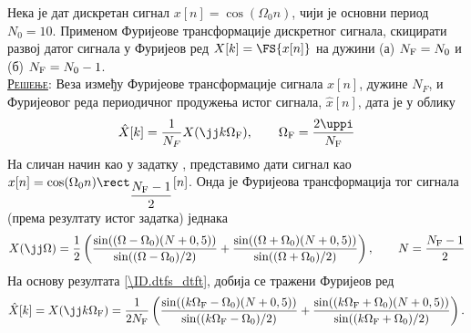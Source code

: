 \PID 
Нека је дат дискретан сигнал $x[n] = \cos(\Omega_0 n)$, чији је основни период $N_0 = 10$. Применом 
Фуријеове трансформације дискретног сигнала, скицирати развој датог сигнала у Фуријеов ред 
$X[k] = \FS{x[n]}$ на дужини (а) $N_{\rm F} = N_0$ и (б) $N_{\rm F} = N_0 - 1$. \\

\textsc{\underline{Решење}:} Веза између Фуријеове трансформације сигнала $x[n]$, дужине $N_F$, и Фуријеовог реда 
периодичног продужења истог сигнала, $\hat x[n]$, дата је у облику 
\begin{equation}
    \hat X[k] = \dfrac{1}{N_F} X(\jj k \Omega_{\rm F}), \qquad \Omega_{\rm F} = \dfrac{2\uppi}{N_{\rm F}} \label{\ID.dtfs_dtft}
\end{equation}
На сличан начин као у задатку , представимо дати сигнал као $x[n] = \cos(\Omega_0 n) \rect_{\dfrac{N_{\rm F}-1}2}[n]$.
Онда је Фуријеова трансформација тог сигнала (према резултату истог задатка) једнака
\begin{equation}
    X(\jj\Omega)
    =
    \dfrac{1}{2} \left(
    \dfrac{\sin( (\Omega - \Omega_0)(N + 0,5) ) }{ \sin((\Omega - \Omega_0)/2) }
    +
    \dfrac{\sin( (\Omega + \Omega_0)(N + 0,5) ) }{ \sin((\Omega + \Omega_0)/2) }  \right), \qquad N = \dfrac{N_{\rm F}-1}{2}
\end{equation}
На основу резултата \ref{\ID.dtfs_dtft}, добија се тражени Фуријеов ред 
\begin{equation}
    \hat X[k] = 
    X(\jj k \Omega_{\rm F} )
    =
    \dfrac{1}{2N_{\rm F}}
    \left(
    \dfrac{\sin( (k \Omega_{\rm F} - \Omega_0)(N + 0,5) ) }{ \sin((k \Omega_{\rm F} - \Omega_0)/2) }
    +
    \dfrac{\sin( (k \Omega_{\rm F} + \Omega_0)(N + 0,5) ) }{ \sin((k \Omega_{\rm F} + \Omega_0)/2) }
    \right).
\end{equation}

